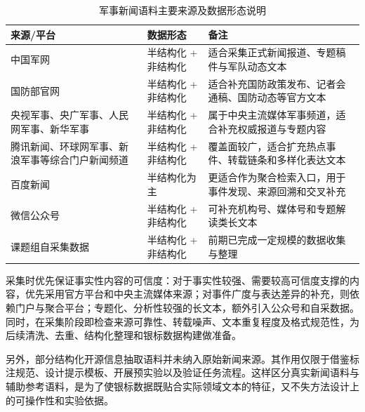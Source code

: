 \begin{table}[htbp]
  \centering
  \caption{军事新闻语料主要来源及数据形态说明}
  \label{tab:military_news_data_sources}
  {\renewcommand{\arraystretch}{1.18}
  \small
  \setlength{\tabcolsep}{3pt}
  \begin{tabularx}{0.96\textwidth}{
    >{\raggedright\arraybackslash}p{}
    >{\raggedright\arraybackslash}p{}
    >{\raggedright\arraybackslash}X
  }
    \toprule
    来源/平台 & 数据形态 & 备注 \\
    \midrule
    中国军网
    & 半结构化 + 非结构化
    & 适合采集正式新闻报道、专题稿件与军队动态文本 \\

    国防部官网
    & 半结构化 + 非结构化
    & 适合补充国防政策发布、记者会通稿、国防动态等官方文本 \\

    央视军事、央广军事、人民网军事、新华军事
    & 半结构化 + 非结构化
    & 属于中央主流媒体军事频道，适合补充权威报道与专题内容 \\

    腾讯新闻、环球网军事、新浪军事等综合门户新闻频道
    & 半结构化 + 非结构化
    & 覆盖面较广，适合扩充热点事件、转载链条和多样化表达文本 \\

    百度新闻
    & 半结构化为主
    & 更适合作为聚合检索入口，用于事件发现、来源回溯和交叉补充 \\

    微信公众号
    & 半结构化 + 非结构化
    & 可补充机构号、媒体号和专题解读类长文本 \\

    课题组自采集数据
    & 半结构化 + 非结构化
    & 前期已完成一定规模的数据收集与整理 \\
    \bottomrule
  \end{tabularx}}
\end{table}

采集时优先保证事实性内容的可信度：对于事实性较强、需要较高可信度支撑的内容，优先采用官方平台和中央主流媒体来源；对事件广度与表达差异的补充，则依赖门户与聚合平台；专题化、分析性较强的长文本，额外引入公众号和自采数据。同时，在采集阶段即检查来源可靠性、转载噪声、文本重复程度及格式规范性，为后续清洗、去重、结构化整理和银标数据构建做准备。

另外，部分结构化开源信息抽取语料并未纳入原始新闻来源。其作用仅限于借鉴标注规范、设计提示模板、开展预实验以及验证任务流程。这样区分真实新闻语料与辅助参考语料，是为了使银标数据既贴合实际领域文本的特征，又不失方法设计上的可操作性和实验依据。

